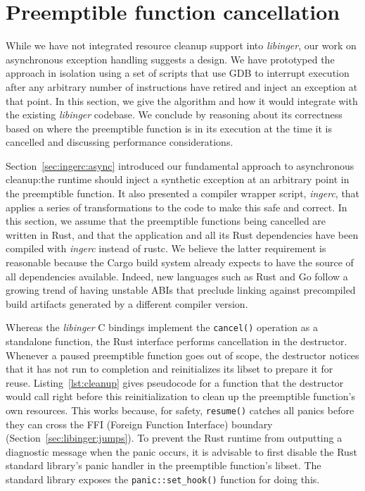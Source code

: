 \section{Preemptible function cancellation}
\label{sec:ingerc:cancellation}

While we have not integrated resource cleanup support into \textit{libinger}, our
work on asynchronous exception handling suggests a design.  We have prototyped the
approach in isolation using a set of scripts that use GDB to interrupt execution
after any arbitrary number of instructions have retired and inject an exception at
that point.  In this section, we give the algorithm and how it would integrate with
the existing \textit{libinger} codebase.  We conclude by reasoning about its
correctness based on where the preemptible function is in its execution at the time
it is cancelled and discussing performance considerations.

\begin{sloppypar}
Section~\ref{sec:ingerc:async} introduced our fundamental approach to asynchronous
cleanup:\@ the runtime should inject a synthetic exception at an arbitrary point in
the preemptible function.  It also presented a compiler wrapper script,
\textit{ingerc}, that applies a series of transformations to the code to make this
safe and correct.  In this section, we assume that the preemptible functions being
cancelled are written in Rust, and that the application and all its Rust dependencies
have been compiled with \textit{ingerc} instead of rustc.  We believe the latter
requirement is reasonable because the Cargo build system already expects to have the
source of all dependencies available.  Indeed, new languages such as Rust and Go
follow a growing trend of having unstable ABIs that preclude linking against
precompiled build artifacts generated by a different compiler version.
\end{sloppypar}

Whereas the \textit{libinger} C bindings implement the \texttt{cancel()} operation as
a standalone function, the Rust interface performs cancellation in the destructor.
Whenever a paused preemptible function goes out of scope, the destructor notices that
it has not run to completion and reinitializes its libset to prepare it for reuse.
Listing~\ref{lst:cleanup} gives pseudocode for a function that the destructor would
call right before this reinitialization to clean up the preemptible function's own
resources.  This works because, for safety, \texttt{resume()} catches all panics
before they can cross the FFI (Foreign Function Interface) boundary
(Section~\ref{sec:libinger:jumps}).  To prevent the
Rust runtime from outputting a diagnostic message when the panic occurs, it is
advisable to first disable the Rust standard library's panic handler in the
preemptible function's libset.  The standard library exposes the
\texttt{panic::set\_hook()} function for doing this.

